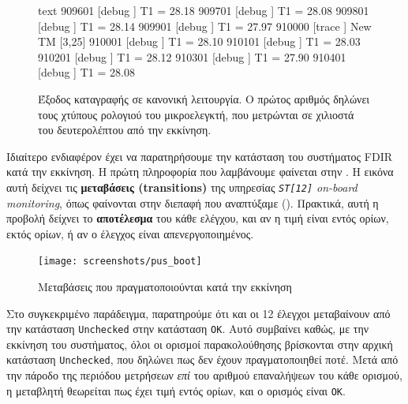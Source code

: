 \documentclass[a4paper,nobib]{tufte-book}
\begin{document}
\begin{figure}
\begin{cminted}{text}
909601  [debug  ] T1 = 28.18
909701  [debug  ] T1 = 28.08
909801  [debug  ] T1 = 28.14
909901  [debug  ] T1 = 27.97
910000  [trace  ] New TM [3,25]
910001  [debug  ] T1 = 28.10
910101  [debug  ] T1 = 28.03
910201  [debug  ] T1 = 28.12
910301  [debug  ] T1 = 27.90
910401  [debug  ] T1 = 28.08
\end{cminted}
\caption[Έξοδος καταγραφής σε κανονική λειτουργία]{Έξοδος καταγραφής σε κανονική λειτουργία. Ο πρώτος αριθμός δηλώνει τους χτύπους ρολογιού του μικροελεγκτή, που μετρώνται σε χιλιοστά του δευτερολέπτου από την εκκίνηση.}
\label{fig:lognominal}
\end{figure}


Ιδιαίτερο ενδιαφέρον έχει να παρατηρήσουμε την κατάσταση του συστήματος \acs{FDIR} κατά την εκκίνηση. Η πρώτη πληροφορία που λαμβάνουμε φαίνεται στην . Η εικόνα αυτή δείχνει τις \textbf{μεταβάσεις (transitions)} της υπηρεσίας \emph{\texttt{ST[12]} on-board monitoring}, όπως φαίνονται στην διεπαφή που αναπτύξαμε (). Πρακτικά, αυτή η προβολή δείχνει το \textbf{αποτέλεσμα} του κάθε ελέγχου, και αν η τιμή είναι εντός ορίων, εκτός ορίων, ή αν ο έλεγχος είναι απενεργοποιημένος.

\begin{figure}
	\texttt{[image: screenshots/pus\_boot]}
	\caption{Μεταβάσεις που πραγματοποιούνται κατά την εκκίνηση}
	\label{fig:pus_boot}
\end{figure}

Στο συγκεκριμένο παράδειγμα, παρατηρούμε ότι και οι 12  έλεγχοι μεταβαίνουν από την κατάσταση \texttt{Unchecked} στην κατάσταση \texttt{OK}. Αυτό συμβαίνει καθώς, με την εκκίνηση του συστήματος, όλοι οι ορισμοί παρακολούθησης βρίσκονται στην αρχική κατάσταση \texttt{Unchecked}, που δηλώνει πως δεν έχουν πραγματοποιηθεί ποτέ. Μετά από την πάροδο της περιόδου μετρήσεων \emph{επί} του αριθμού επαναλήψεων του κάθε ορισμού, η μεταβλητή θεωρείται πως έχει τιμή εντός ορίων, και ο ορισμός είναι \texttt{OK}.
\end{document}
